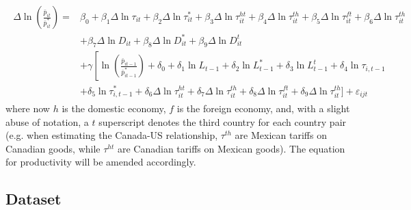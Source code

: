 \begin{align}
\begin{split}\label{eq:gw-estimation-prices-third-country}
\Delta \ln \left( \frac{\bar{p}_{it}}{\bar{p}_{it}^*} \right) = 
&\beta_0 + \beta_1 \Delta \ln \tau_{it} + \beta_2 \Delta \ln \tau_{it}^* + \beta_3 \Delta \ln \tau_{it}^{ht} 
+ \beta_4 \Delta \ln \tau_{it}^{th} + \beta_5 \Delta \ln \tau_{it}^{ft} + \beta_6 \Delta \ln \tau_{it}^{th} \\ 
&+ \beta_7 \Delta \ln D_{it} + \beta_8 \Delta \ln D_{it}^* + \beta_9 \Delta \ln D_{it}^t \\ 
&+ \gamma \left[ \ln \left( \frac{\bar{p}_{it-1}}{\bar{p}_{it-1}^*} \right) + \delta_0 + \delta_1 \ln L_{t-1} + \delta_2\ln L_{t-1}^* 
 + \delta_3 \ln L_{t-1}^t+ \delta_4 \ln \tau_{i,t-1} \right. \\ 
&+ \left. \delta_5 \ln  \tau_{i,t-1}^*  + \delta_6 \Delta \ln \tau_{it}^{ht} + \delta_7 \Delta \ln \tau_{it}^{th} 
 + \delta_8 \Delta \ln \tau_{it}^{ft} + \delta_9 \Delta \ln \tau_{it}^{th} \bigg] \right. + \varepsilon_{ijt} 
\end{split}\end{align}
where now $h$ is the domestic economy, $f$ is the foreign economy, and, with a slight abuse of notation, a $t$ superscript denotes the third country for each country pair (e.g. when estimating the Canada-US relationship, $\tau^{th}$ are Mexican tariffs on Canadian goods, while $\tau^{ht}$ are Canadian tariffs on Mexican goods). The equation for productivity will be amended accordingly. 

\subsection{Dataset}


